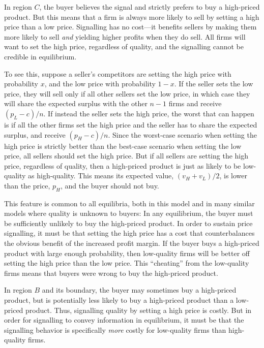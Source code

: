 \documentclass[12pt]{article}
\begin{document}
In region $C$, the buyer believes the signal and strictly prefers to buy a high-priced product. But this means that a firm is always more likely to sell by setting a high price than a low price. Signalling has no cost---it benefits sellers by making them more likely to sell \emph{and} yielding higher profits when they do sell. All firms will want to set the high price, regardless of quality, and the signalling cannot be credible in equilibrium.

To see this, suppose a seller's competitors are setting the high price with probability $x$, and the low price with probability $1-x$. If the seller sets the low price, they will sell only if all other sellers set the low price, in which case they will share the expected surplus with the other $n-1$ firms and receive $(p_L - c)/n$. If instead the seller sets the high price, the worst that can happen is if all the other firms set the high price and the seller has to share the expected surplus, and receive $(p_H - c)/n$. Since the worst-case scenario when setting the high price is strictly better than the best-case scenario when setting the low price, all sellers should set the high price. But if all sellers are setting the high price, regardless of quality, then a high-priced product is just as likely to be low-quality as high-quality. This means its expected value, $(v_H + v_L)/2$, is lower than the price, $p_H$, and the buyer should not buy. 

This feature is common to all equilibria, both in this model and in many similar models where quality is unknown to buyers: In any equilibrium, the buyer must be sufficiently unlikely to buy the high-priced product. In order to sustain price signalling, it must be that setting the high price has a cost that counterbalances the obvious benefit of the increased profit margin. If the buyer buys a high-priced product with large enough probability, then low-quality firms will be better off setting the high price than the low price. This ``cheating'' from the low-quality firms means that buyers were wrong to buy the high-priced product.

In region $B$ and its boundary, the buyer may sometimes buy a high-priced product, but is potentially less likely to buy a high-priced product than a low-priced product. Thus, signalling quality by setting a high price is costly. But in order for signalling to convey information in equilibrium, it must be that the signalling behavior is specifically \emph{more} costly for low-quality firms than high-quality firms.
\end{document}
